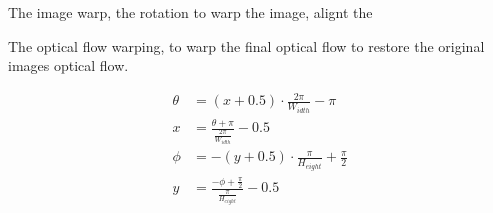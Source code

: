 
The image warp, the rotation to warp the image, alignt the 

The optical flow warping, to warp the final optical flow to restore the original images optical flow.

\begin{equation}\label{equ:app:sph2erp}
\begin{split}
\theta &= (x+0.5) \cdot\frac{2 \pi}{W_{idth}}- \pi
\\
x &= \frac{\theta + \pi}{\frac{2\pi}{W_{idth}}} - 0.5
\\
\phi&=-(y+0.5) \cdot \frac{\pi}{H_{eight}} + \frac{\pi}{2}
\\
y &=\frac{-\phi+\frac{\pi}{2}}{\frac{\pi}{H_{eight}}}-0.5
\end{split}
\end{equation}
